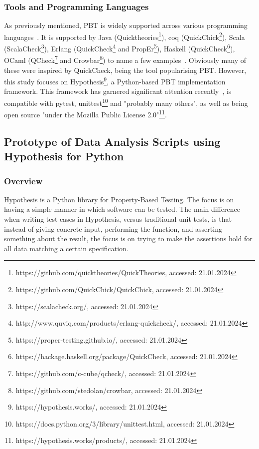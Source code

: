 \documentclass[runningheads]{llncs}
\begin{document}
\subsubsection{Tools and Programming Languages}
As previously mentioned, PBT is widely supported across various programming languages~\cite{Chen2022,Shi2023}. It is supported by Java (Quicktheories\footnote{https://github.com/quicktheories/QuickTheories, accessed: 21.01.2024}), coq (QuickChick\footnote{https://github.com/QuickChick/QuickChick, accessed: 21.01.2024}), Scala (ScalaCheck\footnote{https://scalacheck.org/, accessed: 21.01.2024}), Erlang (QuickCheck\footnote{http://www.quviq.com/products/erlang-quickcheck/, accessed: 21.01.2024} and PropEr\footnote{https://proper-testing.github.io/, accessed: 21.01.2024}), Haskell (QuickCheck\footnote{https://hackage.haskell.org/package/QuickCheck, accessed: 21.01.2024}), OCaml (QCheck\footnote{https://github.com/c-cube/qcheck/, accessed: 21.01.2024} and Crowbar\footnote{https://github.com/stedolan/crowbar, accessed: 21.01.2024}) to name a few examples~\cite{MacIver2016,Padhye2019,Paraskevopoulou2015,Arts2008,Papadakis2011,Claessen2000}. Obviously many of these were inspired by QuickCheck, being the tool popularising PBT. However, this study focuses on Hypothesis\footnote{https://hypothesis.works/, accessed: 21.01.2024}, a Python-based PBT implementation framework. This framework has garnered significant attention recently~\cite{Corgozinho2023,MacIver2019}, is compatible with pytest, unittest\footnote{https://docs.python.org/3/library/unittest.html, accessed: 21.01.2024} and "probably many others", as well as being open source "under the Mozilla Public License 2.0"\footnote{https://hypothesis.works/products/, accessed: 21.01.2024}.

\subsection{Prototype of Data Analysis Scripts using Hypothesis for Python}
\subsubsection{Overview}
Hypothesis is a Python library for Property-Based Testing. The focus is on having a simple manner in which software can be tested. The main difference when writing test cases in Hypothesis, versus traditional unit tests, is that instead of giving concrete input, performing the function, and asserting something about the result, the focus is on trying to make the assertions hold for all data matching a certain specification.
\end{document}

